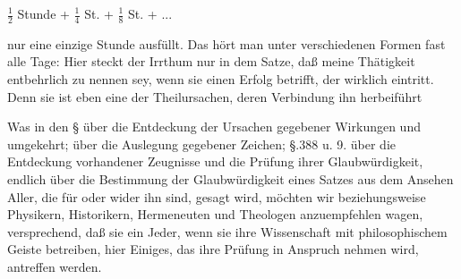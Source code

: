 \centerline{\ensuremath{\frac{1}{2}} Stunde + \ensuremath{\frac{1}{4}} St. + \ensuremath{\frac{1}{8}} St. + ... }\par\noindent
nur eine einzige Stunde ausfüllt. Das  hört man unter verschiedenen Formen fast alle Tage:  Hier steckt der Irrthum nur in dem Satze, daß meine Thätigkeit entbehrlich zu nennen sey, wenn sie einen Erfolg betrifft, der wirklich eintritt. Denn sie ist eben eine der Theilursachen, deren Verbindung ihn herbeiführt \usw\ \par 
Was in den § über die Entdeckung der Ursachen gegebener Wirkungen und umgekehrt;  über die Auslegung gegebener Zeichen; §.388 u. 9. über die Entdeckung vorhandener Zeugnisse und die Prüfung ihrer Glaubwürdigkeit, endlich  über die Bestimmung der Glaubwürdigkeit eines Satzes aus dem Ansehen Aller, die für oder wider ihn sind, gesagt wird, möchten wir beziehungsweise Physikern, Historikern, Hermeneuten und Theologen anzuempfehlen wagen, versprechend, daß sie ein Jeder, wenn sie ihre Wissenschaft mit philosophischem Geiste betreiben, hier Einiges, das ihre Prüfung in Anspruch nehmen wird, antreffen werden. \par 

